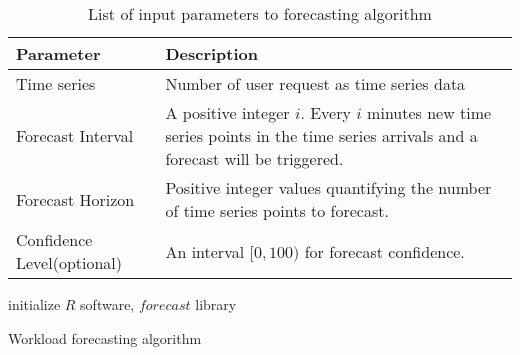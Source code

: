 \begin{flushleft}
  \begin{table}
    \begin{tabular}{ | L{5cm} | L{5cm} |}
      \hline
      Parameter & Description \\ \hline
      Time series & Number of user request as time series data \\ \hline
      Forecast Interval & A positive integer \(i\). Every \(i\) minutes new time series points in the time series arrivals and a forecast will be triggered. \\ \hline
      Forecast Horizon & Positive integer values quantifying the number of time series points to forecast.  \\ \hline
      Confidence Level(optional)  & An interval \([0,100)\) for forecast confidence.\\ \hline
    \end{tabular}
    \caption{List of input parameters to forecasting algorithm}
     \label{table:forecastparameter}
\end{table}
\end{flushleft}

\LinesNumbered
\begin{algorithm}[H]
 initialize \(R\) software, \(forecast\) library \;
  \caption{Workload forecasting algorithm}
  \label{algo:forecastalgo}
 \end{algorithm}

